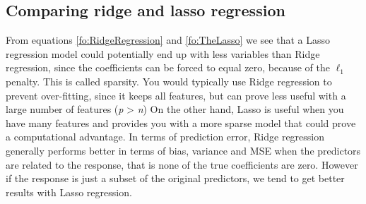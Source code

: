 \subsection{Comparing ridge and lasso regression}

From equations \ref{fo:RidgeRegression} and \ref{fo:TheLasso} we see that a Lasso regression model could potentially end up with less variables than Ridge regression, since the coefficients can be forced to equal zero, because of the $\ell_1$ penalty. This is called sparsity. You would typically use Ridge regression to prevent over-fitting, since it keeps all features, but can prove less useful with a large number of features (\textit{p} > \textit{n}) On the other hand, Lasso is useful when you have many features and provides you with a more sparse model that could prove a computational advantage. In terms of prediction error, Ridge regression generally performs better in terms of bias, variance and MSE when the predictors are related to the response, that is none of the true coefficients are zero. However if the response is just a subset of the original predictors, we tend to get better results with Lasso regression.

